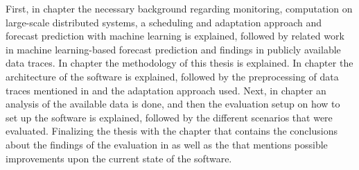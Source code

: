             First, in chapter  the necessary background regarding monitoring, computation on large-scale distributed systems, a scheduling and adaptation approach and forecast prediction with machine learning is explained, followed by related work in machine learning-based forecast prediction and findings in publicly available data traces.
            In chapter  the methodology of this thesis is explained. 
            In chapter  the architecture of the software is explained, followed by the preprocessing of data traces mentioned in  and the adaptation approach used.
            Next, in chapter  an analysis of the available data is done, and then the evaluation setup on how to set up the software is explained, followed by the different scenarios that were evaluated. 
            Finalizing the thesis with the chapter  that contains the conclusions about the findings of the evaluation in  as well as the  that mentions possible improvements upon the current state of the software.


